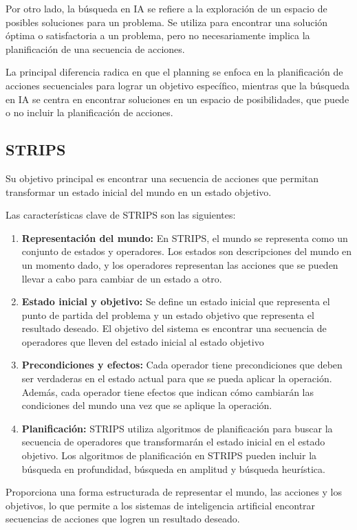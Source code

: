 Por otro lado, la búsqueda en IA se refiere a la exploración de un espacio de posibles soluciones para un problema. Se utiliza para encontrar una solución óptima o satisfactoria a un problema, pero no necesariamente implica la planificación de una secuencia de acciones. 

La principal diferencia radica en que el planning se enfoca en la planificación de acciones secuenciales para lograr un objetivo específico, mientras que la búsqueda en IA se centra en encontrar soluciones en un espacio de posibilidades, que puede o no incluir la planificación de acciones.

\subsection{STRIPS}
Su objetivo principal es encontrar una secuencia de acciones que permitan transformar un estado inicial del mundo en un estado objetivo.

Las características clave de STRIPS son las siguientes:

\begin{enumerate}
  \item \textbf{Representación del mundo: }En STRIPS, el mundo se representa como un conjunto de estados y operadores. Los estados son descripciones del mundo en un momento dado, y los operadores representan las acciones que se pueden llevar a cabo para cambiar de un estado a otro.
  \item \textbf{Estado inicial y objetivo:} Se define un estado inicial que representa el punto de partida del problema y un estado objetivo que representa el resultado deseado. El objetivo del sistema es encontrar una secuencia de operadores que lleven del estado inicial al estado objetivo
  \item \textbf{Precondiciones y efectos:}  Cada operador tiene precondiciones que deben ser verdaderas en el estado actual para que se pueda aplicar la operación. Además, cada operador tiene efectos que indican cómo cambiarán las condiciones del mundo una vez que se aplique la operación.
  \item \textbf{Planificación:} STRIPS utiliza algoritmos de planificación para buscar la secuencia de operadores que transformarán el estado inicial en el estado objetivo. Los algoritmos de planificación en STRIPS pueden incluir la búsqueda en profundidad, búsqueda en amplitud y búsqueda heurística.
\end{enumerate}

Proporciona una forma estructurada de representar el mundo, las acciones y los objetivos, lo que permite a los sistemas de inteligencia artificial encontrar secuencias de acciones que logren un resultado deseado. 

